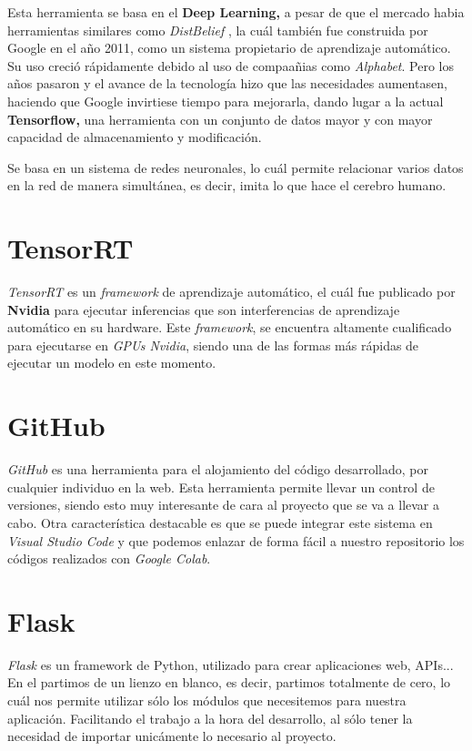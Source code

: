 Esta herramienta se basa en el \textbf{Deep Learning,} a pesar de que el mercado habia herramientas similares como \textit{DistBelief} \cite{distBelief}, la cuál también fue construida por Google en el año 2011, como un sistema propietario de aprendizaje automático. Su uso creció rápidamente debido al uso de compaañias como \textit{Alphabet}. Pero los años pasaron y el avance de la tecnología 
hizo que las necesidades aumentasen, haciendo que Google invirtiese tiempo para mejorarla, dando lugar a la actual \textbf{Tensorflow,} una herramienta con un conjunto de datos mayor y con mayor capacidad de almacenamiento y modificación.

Se basa en un sistema de redes neuronales, lo cuál permite relacionar varios datos en la red de manera simultánea, es decir, imita lo que hace el cerebro humano.

\section{TensorRT}
\textit{TensorRT} \cite{tensorrt} es un \textit{framework} de aprendizaje automático, el cuál fue publicado por \textbf{Nvidia} para ejecutar inferencias que son interferencias de aprendizaje automático en su hardware. Este \textit{framework}, se encuentra altamente cualificado para ejecutarse en \textit{GPUs Nvidia}, siendo una de las formas más rápidas de ejecutar un modelo en este momento.


\section{GitHub}
\textit{GitHub} \cite{github} es una herramienta para el alojamiento del código desarrollado, por cualquier individuo en la web. Esta herramienta permite llevar un control de versiones, siendo esto muy interesante de cara al proyecto que se va a llevar a cabo.
Otra característica destacable es que se puede integrar este sistema en \textit{Visual Studio Code} \cite{visualStudioCode} y que podemos enlazar de forma fácil a nuestro repositorio los códigos realizados con \textit{Google Colab}\cite{colab}.

\section{Flask}
\textit{Flask} \cite{flask} es un framework de Python, utilizado para crear aplicaciones web, APIs... En el partimos de un lienzo en blanco, es decir, partimos totalmente de cero, lo cuál nos permite utilizar sólo los módulos que necesitemos para nuestra aplicación.
Facilitando el trabajo a la hora del desarrollo, al sólo tener la necesidad de importar unicámente lo necesario al proyecto.

